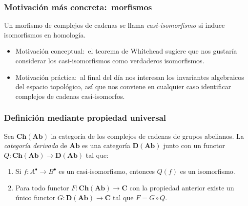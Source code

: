 \documentclass[12pt]{beamer}
\begin{document}
\begin{frame}
  \frametitle{Motivación más concreta:~morfismos}
  Un morfismo de complejos de cadenas se llama \textit{casi-isomorfismo} si induce isomorfismos en homología.
  \pause
  \begin{itemize}
    \item Motivación conceptual:~el teorema de Whitehead sugiere que nos gustaría considerar los casi-isomorfismos como verdaderos isomorfismos.
      \pause
    \item Motivación práctica:~al final del día nos interesan los invariantes algebraicos del espacio topológico, así que nos conviene en cualquier caso identificar complejos de cadenas casi-isomorfos.
  \end{itemize}
\end{frame}

\begin{frame}
  \frametitle{Definición mediante propiedad universal}
  Sea $\mathbf{Ch}(\mathbf{Ab})$ la categoría de los complejos de cadenas de grupos abelianos.
  \pause
  La \textit{categoría derivada} de $\mathbf{Ab}$ es una categoría $\mathbf{D}(\mathbf{Ab})$ junto con un functor $Q \colon \mathbf{Ch}(\mathbf{Ab}) \to \mathbf{D}(\mathbf{Ab})$ tal que:
  \pause
  \begin{enumerate}
    \item Si $f \colon A^{\bullet} \to B^{\bullet}$ es un casi-isomorfismo, entonces $Q(f)$ es un isomorfismo.
      \pause
    \item Para todo functor $F \colon \mathbf{Ch}(\mathbf{Ab}) \to \mathbf{C}$ con la propiedad anterior existe un único functor $G \colon \mathbf{D}(\mathbf{Ab}) \to \mathbf{C}$ tal que $F = G \circ Q$.
  \end{enumerate}
  \begin{center}
  \end{center}
\end{frame}
\end{document}
